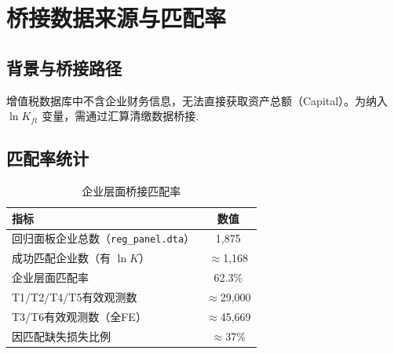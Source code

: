 \documentclass[12pt]{article}
\begin{document}
\section{桥接数据来源与匹配率}

\subsection{背景与桥接路径}

增值税数据库中不含企业财务信息，无法直接获取资产总额（Capital）。为纳入 $\ln K_{ft}$ 变量，需通过汇算清缴数据桥接.

\subsection{匹配率统计}

\begin{table}[H]
  \centering
  \caption{企业层面桥接匹配率}
  \begin{tabular}{lc}
    \toprule
    指标 & 数值 \\
    \midrule
    回归面板企业总数（\texttt{reg\_panel.dta}）& 1,875 \\
    成功匹配企业数（有 $\ln K$）              & $\approx$1,168 \\
    企业层面匹配率                            & 62.3\% \\
    T1/T2/T4/T5有效观测数                    & $\approx$29,000 \\
    T3/T6有效观测数（全FE）                  & $\approx$45,669 \\
    因匹配缺失损失比例                        & $\approx$37\% \\
    \bottomrule
  \end{tabular}
\end{table}
\end{document}
